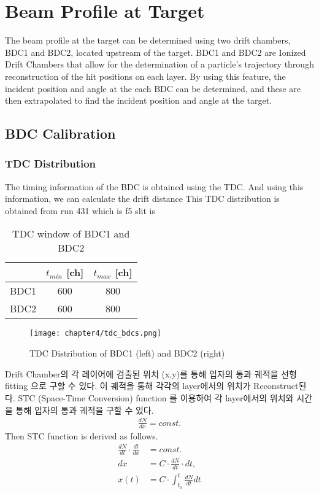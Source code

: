 \section{Beam Profile at Target}
The beam profile at the target can be determined using two drift chambers, BDC1 and BDC2, located upstream of the target. BDC1 and BDC2 are Ionized Drift Chambers that allow for the determination of a particle's trajectory through reconstruction of the hit positions on each layer. By using this feature, the incident position and angle at the each BDC can be determined, and these are then extrapolated to find the incident position and angle at the target.

\subsection{BDC Calibration}

\subsubsection{TDC Distribution}
The timing information of the BDC is obtained using the TDC. And using this information, we can calculate the drift distance
This TDC distribution is obtained from run 431 which is f5 slit is

\begin{table}[h]
    \centering
    \begin{tabular}{c|cc}
        \hline
        &$t_{min}$ [ch]&$t_{max}$ [ch]\\
        \hline
        BDC1&600&800\\
        BDC2&600&800\\        
        \hline
    \end{tabular}
    \caption[short]{TDC window of BDC1 and BDC2}
\end{table}

\begin{figure}
    \centering
    \texttt{[image: chapter4/tdc\_bdcs.png]}
    \caption{TDC Distribution of BDC1 (left) and BDC2 (right)}
    \label{TDC Distribution}
\end{figure}
Drift Chamber의 각 레이어에 검출된 위치 (x,y)를 통해 입자의 통과 궤적을 선형 fitting 으로 구할 수 있다. 이 궤적을 통해 각각의 layer에서의 위치가 Reconstruct된다.  STC (Space-Time Conversion) function 를 이용하여 각 layer에서의 위치와 시간을 통해 입자의 통과 궤적을 구할 수 있다. 
\begin{align}
    \frac{dN}{dx} = const.  
\end{align}
Then STC function is derived as follows.
\begin{align}
    \frac{dN}{dt} \cdot \frac{dt}{dx} &= const.\\
    dx &= C \cdot \frac{dN}{dt} \cdot dt,\\
    x(t) &= C \cdot \int_{t_{0}}^{t} \frac{dN}{dt} dt
\end{align}

